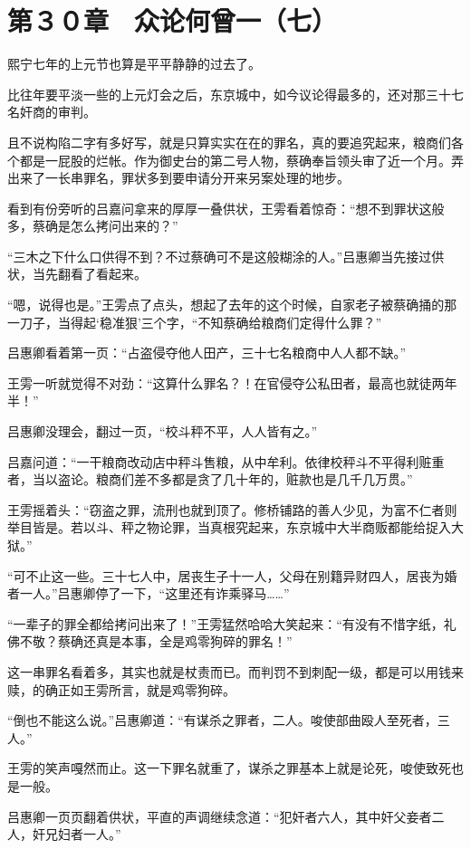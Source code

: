 \section{第３０章　众论何曾一（七）}

熙宁七年的上元节也算是平平静静的过去了。

比往年要平淡一些的上元灯会之后，东京城中，如今议论得最多的，还对那三十七名奸商的审判。

且不说构陷二字有多好写，就是只算实实在在的罪名，真的要追究起来，粮商们各个都是一屁股的烂帐。作为御史台的第二号人物，蔡确奉旨领头审了近一个月。弄出来了一长串罪名，罪状多到要申请分开来另案处理的地步。

看到有份旁听的吕嘉问拿来的厚厚一叠供状，王雱看着惊奇：“想不到罪状这般多，蔡确是怎么拷问出来的？”

“三木之下什么口供得不到？不过蔡确可不是这般糊涂的人。”吕惠卿当先接过供状，当先翻看了看起来。

“嗯，说得也是。”王雱点了点头，想起了去年的这个时候，自家老子被蔡确捅的那一刀子，当得起‘稳准狠’三个字，“不知蔡确给粮商们定得什么罪？”

吕惠卿看着第一页：“占盗侵夺他人田产，三十七名粮商中人人都不缺。”

王雱一听就觉得不对劲：“这算什么罪名？！在官侵夺公私田者，最高也就徒两年半！”

吕惠卿没理会，翻过一页，“校斗秤不平，人人皆有之。”

吕嘉问道：“一干粮商改动店中秤斗售粮，从中牟利。依律校秤斗不平得利赃重者，当以盗论。粮商们差不多都是贪了几十年的，赃款也是几千几万贯。”

王雱摇着头：“窃盗之罪，流刑也就到顶了。修桥铺路的善人少见，为富不仁者则举目皆是。若以斗、秤之物论罪，当真根究起来，东京城中大半商贩都能给捉入大狱。”

“可不止这一些。三十七人中，居丧生子十一人，父母在别籍异财四人，居丧为婚者一人。”吕惠卿停了一下，“这里还有诈乘驿马……”

“一辈子的罪全都给拷问出来了！”王雱猛然哈哈大笑起来：“有没有不惜字纸，礼佛不敬？蔡确还真是本事，全是鸡零狗碎的罪名！”

这一串罪名看着多，其实也就是杖责而已。而判罚不到刺配一级，都是可以用钱来赎，的确正如王雱所言，就是鸡零狗碎。

“倒也不能这么说。”吕惠卿道：“有谋杀之罪者，二人。唆使部曲殴人至死者，三人。”

王雱的笑声嘎然而止。这一下罪名就重了，谋杀之罪基本上就是论死，唆使致死也是一般。

吕惠卿一页页翻着供状，平直的声调继续念道：“犯奸者六人，其中奸父妾者二人，奸兄妇者一人。”

